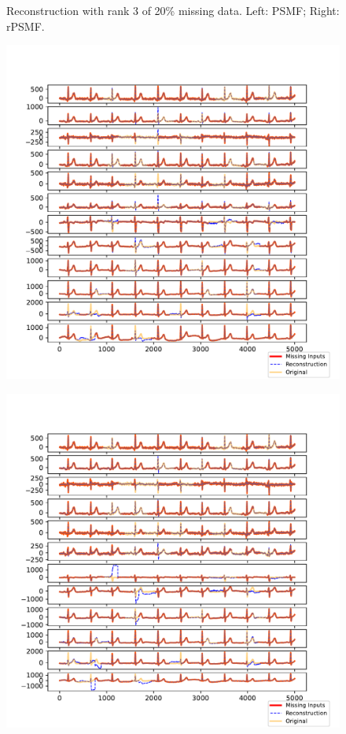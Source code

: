 \documentclass{mldsmsc}
\begin{document}
\begin{figure}[H]
\begin{minipage}{0.4\linewidth}
\end{minipage}
\caption{Reconstruction with rank 3 of 20\% missing data. Left: PSMF; Right: rPSMF.}
\end{figure}

\begin{figure}[H]
\centering
\begin{minipage}{0.4\linewidth}
    \centering
    \includegraphics[width=\linewidth]{images/missing/psmf_output_20_10.pdf}
    \label{fig:limp}
\end{minipage}%
\hspace{0.05\linewidth}
\begin{minipage}{0.4\linewidth}
    \centering
    \includegraphics[width=\linewidth]{images/missing/rpsmf_output_20_10.pdf}

\end{minipage}
\end{figure}
\end{document}
